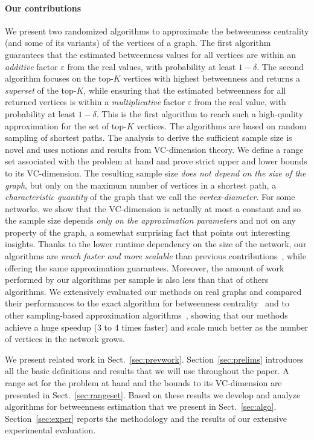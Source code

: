 \paragraph{Our contributions} 
We present two randomized algorithms to approximate the betweenness centrality
(and some of its variants) of the vertices of a graph. The first algorithm
guarantees that the estimated betweenness values for all vertices are within an
\emph{additive} factor $\varepsilon$ from the real values, with probability at
least $1-\delta$. The second algorithm focuses on the top-$K$ vertices with
highest betweenness and returns a \emph{superset} of the top-$K$,
while ensuring that the estimated betweenness for all returned vertices is
within a \emph{multiplicative} factor $\varepsilon$ from the real value, with
probability at least $1-\delta$. This is the first algorithm to reach such a
high-quality approximation for the set of top-$K$ vertices. The algorithms are
based on random sampling of shortest paths. The analysis to derive the
sufficient sample size is novel and uses notions and results from VC-dimension
theory. We define a range set associated with the problem at hand and prove strict
upper and lower bounds to its VC-dimension. The resulting sample size \emph{does not
depend on the size of the graph}, but only on the maximum number of vertices
in a shortest path, a \emph{characteristic quantity} of the graph that we call
the \emph{vertex-diameter}. For some networks, we show that the VC-dimension is
actually
at most a constant and so the sample size depends \emph{only on the approximation
parameters} and not on any property of the graph, a somewhat surprising fact
that points out interesting insights. Thanks to the lower runtime dependency on
the size of the network, our algorithms are \emph{much faster and more scalable}
than previous contributions~\citep{JacobKLPT05,BrandesP07,GeisbergerSS08}, while
offering the same approximation guarantees. Moreover, the amount of work
performed by our algorithms per sample is also less than that of others algorithms.
We extensively evaluated our methods on real graphs and compared their
performances to the exact algorithm for betweenness centrality~\citep{Brandes01}
and to other sampling-based approximation
algorithms~\citep{JacobKLPT05,BrandesP07,GeisbergerSS08}, showing that our
methods achieve a huge speedup (3 to 4 times faster) and scale much better as
the number of vertices in the network grows.

We present related work in Sect.~\ref{sec:prevwork}. Section~\ref{sec:prelims}
introduces all the basic definitions and results that we will use throughout the
paper. A range set for the problem at hand and the bounds to its VC-dimension
are presented in Sect.~\ref{sec:rangeset}. Based on these results we develop and
analyze algorithms for betweenness estimation that we present in
Sect.~\ref{sec:algo}. Section~\ref{sec:exper} reports the methodology and
the results of our extensive experimental evaluation.

